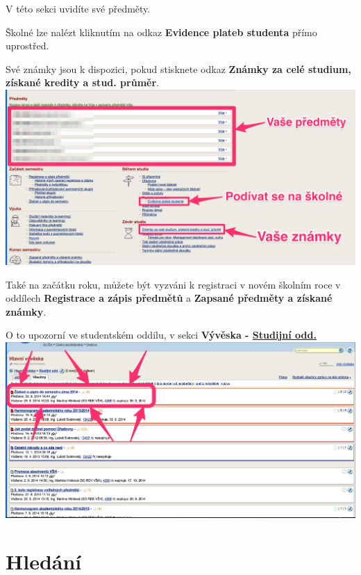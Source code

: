 \documentclass[a4paper,12pt]{article}
\begin{document}
V této sekci uvidíte své předměty.

Školné lze nalézt kliknutím na odkaz
\textbf{Evidence plateb studenta} přímo uprostřed.

Své známky jsou k dispozici,
pokud stisknete odkaz 
\textbf{Známky za celé studium, získané kredity a stud. průměr}. \\

\includegraphics[width=\textwidth]{s18-1} \\

\newpage

Také na začátku roku, můžete být vyzváni k registraci v novém školním roce v oddílech
\textbf{Registrace a zápis předmětů} a \textbf{Zapsané předměty a získané známky}.

O to upozorní ve studentském oddilu, v sekci
\textbf{Vývěska - \href{https://is.vsh.cz/auth/bb/skola/studijni/}{Studijní odd.}} \\

\includegraphics[width=\textwidth]{s19} \\

\newpage

\section{Hledání}
\end{document}
